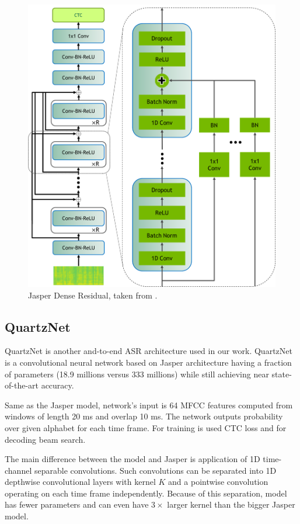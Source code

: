 \begin{figure}[h]
    \centering
    \includegraphics[scale=0.7]{img/JasperVerticalDR4.png}
    \caption{Jasper Dense Residual, taken from .}
    \label{fig:jasper_dr}
\end{figure}

\subsection{QuartzNet}

QuartzNet  is another and-to-end ASR architecture used in our work. QuartzNet is a convolutional neural network based on Jasper  architecture having a fraction of parameters (18.9 millions versus 333 millions) while still achieving near state-of-the-art accuracy.

Same as the Jasper model, network's input is 64 MFCC features computed from windows of length 20 ms and overlap 10 ms. The network outputs probability over given alphabet for each time frame. For training is used CTC loss and for decoding beam search.

The main difference between the model and Jasper is application of 1D time-channel separable convolutions.  Such convolutions can be separated into 1D depthwise convolutional layers with kernel $K$ and a pointwise convolution operating on each time frame independently. Because of this separation, model has fewer parameters and can even have $3 \times$ larger kernel than the bigger Jasper model.

